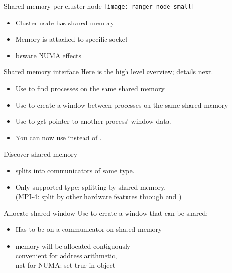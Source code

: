 \begin{numberedframe}{Shared memory per cluster node}
  \texttt{[image: ranger-node-small]}
  \begin{itemize}
  \item Cluster node has shared memory
  \item Memory is attached to specific socket
  \item beware \ac{NUMA} effects
  \end{itemize}
\end{numberedframe}

\begin{numberedframe}{Shared memory interface}
  Here is the high level overview; details next.
  \begin{itemize}
  \item Use  to find processes on the same
    shared memory
  \item Use  to create a window between
    processes on the same shared memory
  \item Use  to get pointer to another
    process' window data.
  \item You can now use  instead of .
  \end{itemize}
\end{numberedframe}

\begin{numberedframe}{Discover shared memory}
  \begin{itemize}
  \item
     splits into communicators of same type.
  \item Only supported type:  splitting by
    shared memory.\\
    (MPI-4: split by other hardware features through 
    and )
  \end{itemize}

\end{numberedframe}

\begin{numberedframe}{Allocate shared window}
Use  to create a window that can
be shared;
\begin{itemize}
\item Has to be on a communicator on shared memory
\item memory will be allocated contiguously\\
  convenient for address arithmetic,\\ not for NUMA:
  set  true in
   object
\end{itemize}
\end{numberedframe}

